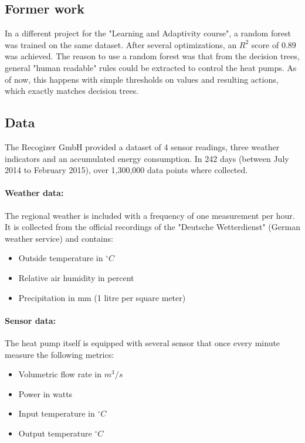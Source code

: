 \documentclass[conference]{IEEEtran}
\begin{document}
\subsection{Former work}%
\label{sec:formerwork}
In a different project for the "Learning and Adaptivity course", a random forest was trained on the same dataset. After several optimizations, an $R^{2}$ score of $0.89$ was achieved. The reason to use a random forest was that from the decision trees, general "human readable" rules could be extracted to control the heat pumps. As of now, this happens with simple thresholds on values and resulting actions, which exactly matches decision trees.


\subsection{Data} 
\label{sec:data}
The Recogizer GmbH provided a dataset of 4 sensor readings, three weather indicators and an accumulated energy consumption. In 242 days (between July 2014 to February 2015), over 1,300,000 data points where collected.

\paragraph{Weather data:}
The regional weather is included with a frequency of one measurement per hour. It is collected from the official recordings of the "Deutsche Wetterdienst" (German weather service) and contains:

\begin{itemize}
	\item Outside temperature in $^\circ C$
	\item Relative air humidity in percent
	\item Precipitation in mm (1 litre per square meter)
\end{itemize}


\paragraph{Sensor data:}
The heat pump itself is equipped with several sensor that once every minute measure the following metrics:
\begin{itemize}
	\item Volumetric flow rate in $m^3 / s$
	\item Power in watts
	\item Input temperature in $^\circ C$
	\item Output temperature $^\circ C$
\end{itemize}
\end{document}
